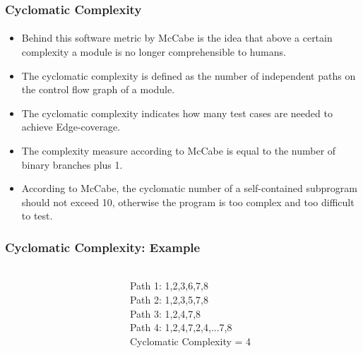 
\begin{frame}
\frametitle{Cyclomatic Complexity}
\framesubtitle{\citet{McCabe1976,EbertCain2016}}
\begin{itemize}
  \item Behind this software metric by McCabe is the idea that above a certain complexity a module is no longer comprehensible to humans. 
  \item The cyclomatic complexity is defined as the number of independent paths on the control flow graph of a module.
  \item The cyclomatic complexity indicates how many test cases are needed to achieve Edge-coverage.
  \item The complexity measure according to McCabe is equal to the number of binary branches plus 1.
  \item According to McCabe, the cyclomatic number of a self-contained subprogram should not exceed 10, otherwise the program is too complex and too difficult to test.
\end{itemize}
\end{frame}


\begin{frame}
\frametitle{Cyclomatic Complexity: Example}
\framesubtitle{\citet{McCabe1976,EbertCain2016}}
\begin{columns}
\begin{column}{0.5\textwidth}
\begin{center}
\end{center}
\end{column}
\begin{column}{0.5\textwidth}
\pause
Path 1:  1,2,3,6,7,8\\
\pause
Path 2:  1,2,3,5,7,8\\
\pause
Path 3:  1,2,4,7,8\\
\pause
Path 4:  1,2,4,7,2,4,...7,8\\
\bigskip\bigskip
Cyclomatic Complexity = 4
\end{column}
\end{columns}
\end{frame}



